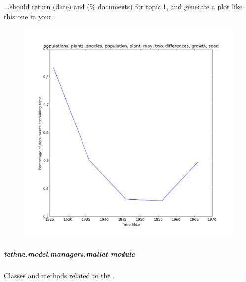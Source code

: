 \documentclass[letterpaper,10pt,english]{sphinxmanual}
\begin{document}
\begin{fulllineitems}
\begin{fulllineitems}
...should return  (date) and  (\% documents) for topic 1,
and generate a plot like this one in your .
\begin{figure}[htbp]
\centering

\includegraphics{topic_1_over_time.png}
\end{figure}

\end{fulllineitems}


\end{fulllineitems}



\subparagraph{tethne.model.managers.mallet module}
\label{tethne.model.managers.mallet:module-tethne.model.managers.mallet}\label{tethne.model.managers.mallet:tethne-model-managers-mallet-module}\label{tethne.model.managers.mallet::doc}
Classes and methods related to the {\hyperref[tethne.model.managers.mallet:tethne.model.managers.mallet.MALLETModelManager]{}}.
\end{document}
